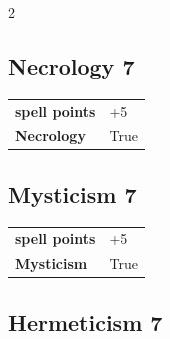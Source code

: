 \begin{multicols}{2}
\begin{tcolorbox}

\end{tcolorbox}

\begin{tcolorbox}
    \subsection*{Necrology \hfill \small{7 }}
    \tcblower




\begin{tabular}{@{}ll@{}}
    \textbf{spell points} & +5\\
    \textbf{Necrology} & True\\
\end{tabular}


\end{tcolorbox}

\begin{tcolorbox}
    \subsection*{Mysticism \hfill \small{7 }}
    \tcblower




\begin{tabular}{@{}ll@{}}
    \textbf{spell points} & +5\\
    \textbf{Mysticism} & True\\
\end{tabular}


\end{tcolorbox}

\begin{tcolorbox}
    \subsection*{Hermeticism \hfill \small{7 }}
    \tcblower





\end{tcolorbox}
\end{multicols}
